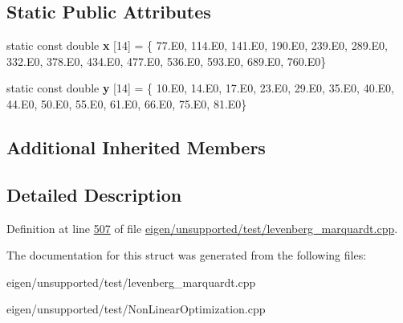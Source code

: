 \subsection*{Static Public Attributes}
\begin{DoxyCompactItemize}
\item 
\mbox{\label{structmisra1d__functor_aa8f3196a2f1feaab0cfa80b428c0eb0b}} 
static const double {\bfseries x} \mbox{[}14\mbox{]} = \{ 77.\+E0, 114.\+E0, 141.\+E0, 190.\+E0, 239.\+E0, 289.\+E0, 332.\+E0, 378.\+E0, 434.\+E0, 477.\+E0, 536.\+E0, 593.\+E0, 689.\+E0, 760.\+E0\}
\item 
\mbox{\label{structmisra1d__functor_abeb982f1f1cd44d4129266017bca75af}} 
static const double {\bfseries y} \mbox{[}14\mbox{]} = \{ 10.\+E0, 14.\+E0, 17.\+E0, 23.\+E0, 29.\+E0, 35.\+E0, 40.\+E0, 44.\+E0, 50.\+E0, 55.\+E0, 61.\+E0, 66.\+E0, 75.\+E0, 81.\+E0\}
\end{DoxyCompactItemize}
\subsection*{Additional Inherited Members}


\subsection{Detailed Description}


Definition at line \hyperlink{eigen_2unsupported_2test_2levenberg__marquardt_8cpp_source_l00507}{507} of file \hyperlink{eigen_2unsupported_2test_2levenberg__marquardt_8cpp_source}{eigen/unsupported/test/levenberg\+\_\+marquardt.\+cpp}.



The documentation for this struct was generated from the following files\+:\begin{DoxyCompactItemize}
\item 
eigen/unsupported/test/levenberg\+\_\+marquardt.\+cpp\item 
eigen/unsupported/test/\+Non\+Linear\+Optimization.\+cpp\end{DoxyCompactItemize}
